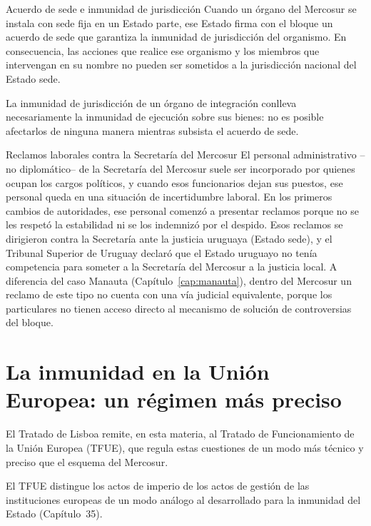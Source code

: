 \documentclass[12pt,oneside]{book}
\begin{document}
\begin{definicion}{Acuerdo de sede e inmunidad de jurisdicción}
Cuando un órgano del Mercosur se instala con sede fija en un Estado parte, ese Estado firma con el bloque un acuerdo de sede que garantiza la inmunidad de jurisdicción del organismo. En consecuencia, las acciones que realice ese organismo y los miembros que intervengan en su nombre no pueden ser sometidos a la jurisdicción nacional del Estado sede.
\end{definicion}

\begin{importante}
La inmunidad de jurisdicción de un órgano de integración conlleva necesariamente la inmunidad de ejecución sobre sus bienes: no es posible afectarlos de ninguna manera mientras subsista el acuerdo de sede.
\end{importante}

\begin{ejemplo}{Reclamos laborales contra la Secretaría del Mercosur}
El personal administrativo --no diplomático-- de la Secretaría del Mercosur suele ser incorporado por quienes ocupan los cargos políticos, y cuando esos funcionarios dejan sus puestos, ese personal queda en una situación de incertidumbre laboral. En los primeros cambios de autoridades, ese personal comenzó a presentar reclamos porque no se les respetó la estabilidad ni se los indemnizó por el despido. Esos reclamos se dirigieron contra la Secretaría ante la justicia uruguaya (Estado sede), y el Tribunal Superior de Uruguay declaró que el Estado uruguayo no tenía competencia para someter a la Secretaría del Mercosur a la justicia local. A diferencia del caso Manauta (Capítulo~\ref{cap:manauta}), dentro del Mercosur un reclamo de este tipo no cuenta con una vía judicial equivalente, porque los particulares no tienen acceso directo al mecanismo de solución de controversias del bloque.
\end{ejemplo}

\section{La inmunidad en la Unión Europea: un régimen más preciso}

El Tratado de Lisboa remite, en esta materia, al Tratado de Funcionamiento de la Unión Europea (TFUE), que regula estas cuestiones de un modo más técnico y preciso que el esquema del Mercosur.

\begin{nota}
El TFUE distingue los actos de imperio de los actos de gestión de las instituciones europeas de un modo análogo al desarrollado para la inmunidad del Estado (Capítulo~35). %
\end{nota}
\end{document}
